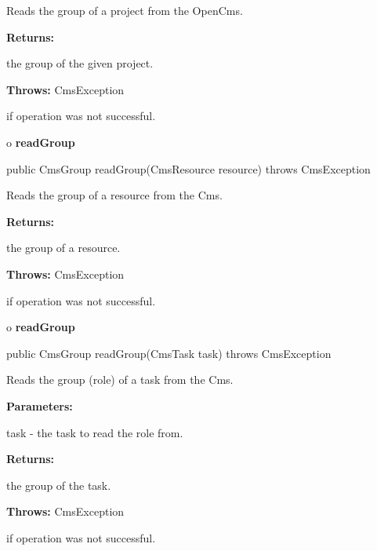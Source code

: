 \begin{description}
\htmlDD Reads the group of a project from the OpenCms. 

\begin{description}
\item {\bf Returns:}  

the group of the given project.  
\item {\bf Throws:} CmsException  

if operation was not successful.  
\end{description}

\end{description}

o {\bf readGroup} 

\begin{PRE}
 public CmsGroup readGroup(CmsResource resource) throws CmsException
\end{PRE}

\begin{description}
\htmlDD Reads the group of a resource from the Cms. 

\begin{description}
\item {\bf Returns:}  

the group of a resource.  
\item {\bf Throws:} CmsException  

if operation was not successful.  
\end{description}

\end{description}

o {\bf readGroup} 

\begin{PRE}
 public CmsGroup readGroup(CmsTask task) throws CmsException
\end{PRE}

\begin{description}
\htmlDD Reads the group (role) of a task from the Cms. 

\begin{description}
\item {\bf Parameters:}  

task - the task to read the role from.  
\item {\bf Returns:}  

the group of the task.  
\item {\bf Throws:} CmsException  

if operation was not successful.  
\end{description}

\end{description}

